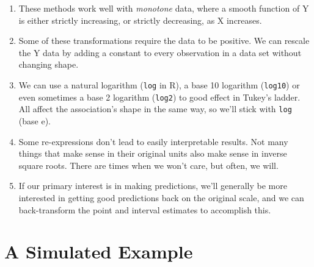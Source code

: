 \documentclass[
]{book}
\providecommand{\tightlist}{%
  \setlength{\itemsep}{0pt}\setlength{\parskip}{0pt}}
\begin{document}
\begin{enumerate}
\def\labelenumi{\arabic{enumi}.}
\tightlist
\item
  These methods work well with \emph{monotone} data, where a smooth function of Y is either strictly increasing, or strictly decreasing, as X increases.
\item
  Some of these transformations require the data to be positive. We can rescale the Y data by adding a constant to every observation in a data set without changing shape.
\item
  We can use a natural logarithm (\texttt{log} in R), a base 10 logarithm (\texttt{log10}) or even sometimes a base 2 logarithm (\texttt{log2}) to good effect in Tukey's ladder. All affect the association's shape in the same way, so we'll stick with \texttt{log} (base e).
\item
  Some re-expressions don't lead to easily interpretable results. Not many things that make sense in their original units also make sense in inverse square roots. There are times when we won't care, but often, we will.
\item
  If our primary interest is in making predictions, we'll generally be more interested in getting good predictions back on the original scale, and we can back-transform the point and interval estimates to accomplish this.
\end{enumerate}

\hypertarget{a-simulated-example}{%
\section{A Simulated Example}\label{a-simulated-example}}
\end{document}
